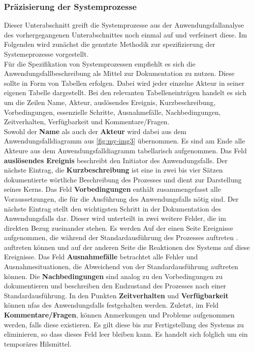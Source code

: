 \documentclass[../../../Bachelorarbeit.tex]{subfiles}
\begin{document}
\subsubsection{Präzisierung der Systemprozesse} \label{AnwfallSpezPraez}
Dieser Unterabschnitt greift die Systemprozesse aus der Anwendungsfallanalyse des vorhergegangenen Unterabschnittes noch einmal auf und verfeinert diese. Im Folgenden wird zunächst die genutzte Methodik zur spezifizierung der Systemeprozesse vorgestellt.\\
Für die Spezifikation von Systemprozessen empfiehlt es sich die Anwendungsfallbeschreibung als Mittel zur Dokumentation zu nutzen. Diese sollte in Form von Tabellen erfolgen. Dabei wird jeder einzelne Akteur in seiner eigenen Tabelle dargestellt. Bei den relevanten Tabelleneinträgen handelt es sich um die Zeilen Name, Akteur, auslösendes Ereignis, Kurzbeschreibung, Vorbedingungen, essenzielle Schritte, Ausnahmefälle, Nachbedingungen, Zeitverhalten, Verfügbarkeit und Kommentare/Fragen.\\ %
Sowohl der \textbf{Name} als auch der \textbf{Akteur} wird dabei aus dem Anwendungsfalldiagramm aus \autoref{fig:my-img3} übernommen. Es sind am Ende alle Akteure aus dem Anwendungsfalldiagramm tabellarisch aufgenommen. Das Feld \textbf{auslösendes Ereignis} beschreibt den Initiator des Anwendungsfalls. Der nächste Eintrag, die \textbf{Kurzbeschreibung} ist eine in zwei bis vier Sätzen dokumentierte wörtliche Beschreibung des Prozesses und dient zur Darstellung seines Kerns. Das Feld \textbf{Vorbedingungen} enthält zusammengefasst alle Voraussetzungen, die für die Ausführung des Anwendungsfalls nötig sind. Der nächste Eintrag stellt den wichtigsten Schritt in der Dokumentation des Anwendungsfalls dar. Dieser wird unterteilt in zwei weitere Felder, die im direkten Bezug zueinander stehen. Es werden Auf der einen Seite Ereignisse aufgenommen, die während der Standardausführung des Prozesses auftreten \bzw. auftreten können und auf der anderen Seite die Reaktionen des Systems auf diese Ereignisse. Das Feld \textbf{Ausnahmefälle} betrachtet alle Fehler und Ausnahmesituationen, die Abweichend von der Standardausführung auftreten können. Die \textbf{Nachbedingungen} sind analog zu den Vorbedingungen zu dokumentieren und beschreiben den Endzustand des Prozesses nach einer Standardausführung. In den Punkten \textbf{Zeitverhalten} und \textbf{Verfügbarkeit} können \acp{nfa} des Anwendungsfalls festgehalten werden. Zuletzt, im Feld \textbf{Kommentare/Fragen}, können Anmerkungen und Probleme aufgenommen werden, falls diese existieren. Es gilt diese bis zur Fertigstellung des Systems zu eliminieren, so dass dieses Feld leer bleiben kann. Es handelt sich folglich um ein temporäres Hilsmittel.\\
\end{document}
